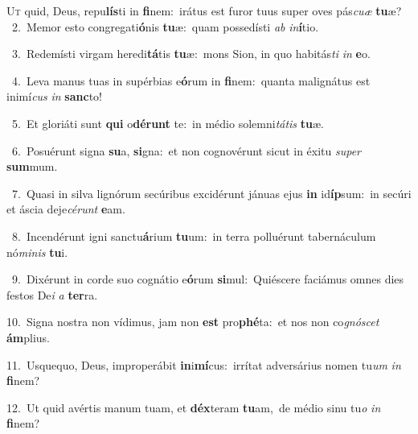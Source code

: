 \lettrine{\initial\textcolor{\initialcolor}{U}}{t} quid, Deus, repu\-\textbf{lís}\-ti in \textbf{fi}\-nem:~\star irátus est furor tuus super oves pás\-\textit{cu}\-\textit{æ} \textbf{tu}\-æ?\\
{\numbfont\textcolor{\numbcolor}{~2.}}~Memor esto congregati\-\textbf{ó}\-nis \textbf{tu}\-æ:~\star quam possedísti \textit{ab} \textit{in}\-\textbf{í}tio.\par
{\numbfont\textcolor{\numbcolor}{~3.}}~Redemísti virgam heredi\-\textbf{tá}\-tis \textbf{tu}\-æ:~\star mons Sion, in quo habitás\textit{ti} \textit{in} \textbf{e}\-o.\par
{\numbfont\textcolor{\numbcolor}{~4.}}~Leva manus tuas in supérbias e\-\textbf{ó}\-rum in \textbf{fi}\-nem:~\star quanta malignátus est inimí\textit{cus} \textit{in} \textbf{sanc}\-to!\par
{\numbfont\textcolor{\numbcolor}{~5.}}~Et gloriáti sunt \textbf{qui} o\-\textbf{dé}\-\textbf{runt} te:~\star in médio solemni\-\textit{tá}\-\textit{tis} \textbf{tu}\-æ.\par
{\numbfont\textcolor{\numbcolor}{~6.}}~Posuérunt signa \textbf{su}\-a, \textbf{si}\-gna:~\star et non cognovérunt sicut in éxitu \textit{su}\-\textit{per} \textbf{sum}\-mum.\par
{\numbfont\textcolor{\numbcolor}{~7.}}~Quasi in silva lignórum secúribus excidérunt jánuas ejus \textbf{in} id\-\textbf{íp}\-sum:~\star in secúri et áscia deje\-\textit{cé}\-\textit{runt} \textbf{e}\-am.\par
{\numbfont\textcolor{\numbcolor}{~8.}}~Incendérunt igni sanctu\-\textbf{á}\-rium \textbf{tu}\-um:~\star in terra polluérunt tabernáculum nó\-\textit{mi}\-\textit{nis} \textbf{tu}\-i.\par
{\numbfont\textcolor{\numbcolor}{~9.}}~Dixérunt in corde suo cognátio e\-\textbf{ó}\-rum \textbf{si}\-mul:~\star Quiéscere faciámus omnes dies festos De\textit{i} \textit{a} \textbf{ter}\-ra.\par
{\numbfont\textcolor{\numbcolor}{10.}}~Signa nostra non vídimus, jam non \textbf{est} pro\-\textbf{phé}\-ta:~\star et nos non co\-\textit{gnó}\-\textit{scet} \textbf{ám}\-plius.\par
{\numbfont\textcolor{\numbcolor}{11.}}~Usquequo, Deus, improperábit \textbf{in}\-i\-\textbf{mí}\-cus:~\star irrítat adversárius nomen tu\textit{um} \textit{in} \textbf{fi}\-nem?\par
{\numbfont\textcolor{\numbcolor}{12.}}~Ut quid avértis manum tuam, et \textbf{déx}\-teram \textbf{tu}\-am,~\star de médio sinu tu\textit{o} \textit{in} \textbf{fi}\-nem?\par
